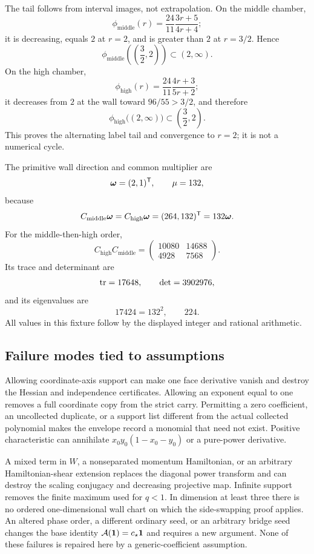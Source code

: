 \documentclass[11pt]{article}
\theoremstyle{definition}
\theoremstyle{remark}
\begin{document}
The tail follows from interval images, not extrapolation.  On the middle
chamber,
\[
\phi_{\mathrm{middle}}(r)
=\frac{24}{11}\frac{3r+5}{4r+4};
\]
it is decreasing, equals \(2\) at \(r=2\), and is greater than \(2\) at
\(r=3/2\).  Hence
\[
\phi_{\mathrm{middle}}\left(\left(\frac32,2\right)\right)
\subset(2,\infty).
\]
On the high chamber,
\[
\phi_{\mathrm{high}}(r)
=\frac{24}{11}\frac{4r+3}{5r+2};
\]
it decreases from \(2\) at the wall toward \(96/55>3/2\), and therefore
\[
\phi_{\mathrm{high}}\bigl((2,\infty)\bigr)
\subset\left(\frac32,2\right).
\]
This proves the alternating label tail and convergence to \(r=2\); it is
not a numerical cycle.

The primitive wall direction and common multiplier are
\[
\boldsymbol{\omega}=(2,1)^{\mathsf T},\qquad \mu=132,
\]
because
\[
C_{\mathrm{middle}}\boldsymbol{\omega}=C_{\mathrm{high}}\boldsymbol{\omega}
=(264,132)^{\mathsf T}=132\boldsymbol{\omega}.
\]
For the middle-then-high order,
\[
C_{\mathrm{high}}C_{\mathrm{middle}}
=\begin{pmatrix}10080&14688\\4928&7568\end{pmatrix}.
\]
Its trace and determinant are
\[
\operatorname{tr}=17648,\qquad \det=3902976,
\]
and its eigenvalues are
\[
17424=132^2,\qquad224.
\]
All values in this fixture follow by the displayed integer and rational
arithmetic.

\subsection{Failure modes tied to assumptions}

Allowing coordinate-axis support can make one face derivative vanish and
destroy the Hessian and independence certificates.  Allowing an exponent
equal to one removes a full coordinate copy from the strict carry.
Permitting a zero coefficient, an uncollected duplicate, or a support list
different from the actual collected polynomial makes the envelope record
a monomial that need not exist.  Positive characteristic can annihilate
\(x_0y_0(1-x_0-y_0)\) or a pure-power derivative.

A mixed term in \(W\), a nonseparated momentum Hamiltonian, or an
arbitrary Hamiltonian-shear extension replaces the diagonal power
transform and can destroy the scaling conjugacy and decreasing
projective map.  Infinite support removes the finite maximum used for
\(q<1\).  In dimension at least three there is no ordered one-dimensional
wall chart on which the side-swapping proof applies.  An altered phase
order, a different ordinary seed, or an arbitrary bridge seed changes the
base identity \(\mathcal{A}(\mathbf{1})=c_\star\mathbf{1}\) and requires a new argument.
None of these failures is repaired here by a generic-coefficient
assumption.
\end{document}
